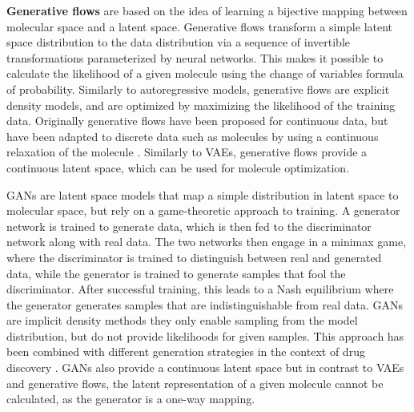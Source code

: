 \textbf{Generative flows} \citep{rezendeVariationalInferenceNormalizing2016} are based on the
idea of learning a bijective mapping between molecular space and a latent space. Generative flows
transform a simple latent space distribution to the data distribution via a sequence of invertible
transformations parameterized by neural networks. This makes it possible to calculate the likelihood
of a given molecule using the change of variables formula of probability. Similarly to
autoregressive models, generative flows are explicit density models, and are optimized by maximizing
the likelihood of the training data. Originally generative flows have been proposed for continuous
data, but have been adapted to discrete data such as molecules by using a continuous relaxation of
the molecule \citep{madhawaGraphNVPInvertibleFlow2019}. Similarly to \acp{VAE}, generative flows provide
a continuous latent space, which can be used for molecule optimization.

\Acp{GAN} \citep{goodfellowGenerativeAdversarialNetworks2014} are latent space models that map a
simple distribution in latent space to molecular space, but rely on a game-theoretic approach to
training. A generator network is trained to generate data, which is then fed to the discriminator
network along with real data. The two networks then engage in a minimax game, where the
discriminator is trained to distinguish between real and generated data, while the generator is
trained to generate samples that fool the discriminator. After successful training, this leads to a
Nash equilibrium where the generator generates samples that are indistinguishable from real data.
\Acp{GAN} are implicit density methods they only enable sampling from the model distribution, but do
not provide likelihoods for given samples. This approach has been combined with different generation
strategies in the context of drug discovery
\citep{decaoMolGANImplicitGenerative2018,kadurinDruGANAdvancedGenerative2017,guimaraesObjectiveReinforcedGenerativeAdversarial2017,mendez-lucioNovoGenerationHitlike2018,tangMolecularGenerativeAdversarial2024}.
GANs also provide a continuous latent space but in contrast to VAEs and generative flows, the latent
representation of a given molecule cannot be calculated, as the generator is a one-way mapping.

